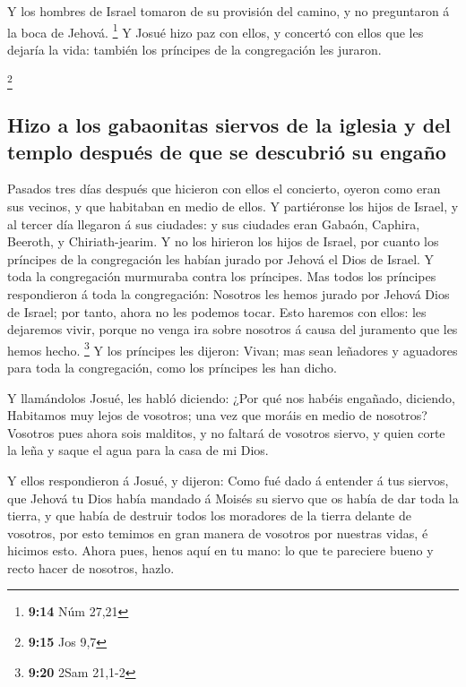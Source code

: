  Y los hombres de Israel tomaron de su provisión del
camino, y no preguntaron á la boca de Jehová. \footnote{\textbf{9:14}
  Núm 27,21}  Y Josué hizo paz con ellos, y concertó con
ellos que les dejaría la vida: también los príncipes de la congregación
les juraron.

\footnote{\textbf{9:15} Jos 9,7}

\hypertarget{hizo-a-los-gabaonitas-siervos-de-la-iglesia-y-del-templo-despuuxe9s-de-que-se-descubriuxf3-su-engauxf1o}{%
\subsection{Hizo a los gabaonitas siervos de la iglesia y del templo
después de que se descubrió su
engaño}\label{hizo-a-los-gabaonitas-siervos-de-la-iglesia-y-del-templo-despuuxe9s-de-que-se-descubriuxf3-su-engauxf1o}}

 Pasados tres días después que hicieron con ellos el
concierto, oyeron como eran sus vecinos, y que habitaban en medio de
ellos.  Y partiéronse los hijos de Israel, y al tercer
día llegaron á sus ciudades: y sus ciudades eran Gabaón, Caphira,
Beeroth, y Chiriath-jearim.  Y no los hirieron los hijos
de Israel, por cuanto los príncipes de la congregación les habían jurado
por Jehová el Dios de Israel. Y toda la congregación murmuraba contra
los príncipes.  Mas todos los príncipes respondieron á
toda la congregación: Nosotros les hemos jurado por Jehová Dios de
Israel; por tanto, ahora no les podemos tocar.  Esto
haremos con ellos: les dejaremos vivir, porque no venga ira sobre
nosotros á causa del juramento que les hemos hecho. \footnote{\textbf{9:20}
  2Sam 21,1-2}  Y los príncipes les dijeron: Vivan; mas
sean leñadores y aguadores para toda la congregación, como los príncipes
les han dicho.

 Y llamándolos Josué, les habló diciendo: ¿Por qué nos
habéis engañado, diciendo, Habitamos muy lejos de vosotros; una vez que
moráis en medio de nosotros?  Vosotros pues ahora sois
malditos, y no faltará de vosotros siervo, y quien corte la leña y saque
el agua para la casa de mi Dios.

 Y ellos respondieron á Josué, y dijeron: Como fué dado á
entender á tus siervos, que Jehová tu Dios había mandado á Moisés su
siervo que os había de dar toda la tierra, y que había de destruir todos
los moradores de la tierra delante de vosotros, por esto temimos en gran
manera de vosotros por nuestras vidas, é hicimos esto. 
Ahora pues, henos aquí en tu mano: lo que te pareciere bueno y recto
hacer de nosotros, hazlo.

